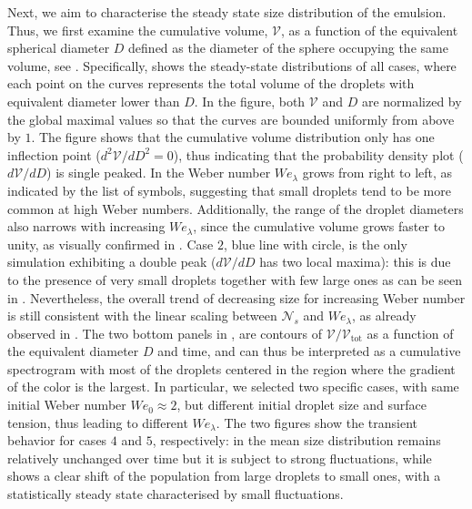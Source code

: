 Next, we aim to characterise the steady state size distribution of the emulsion. Thus, we first examine the cumulative volume, $\mathcal{V}$, as a function of the equivalent spherical diameter $D$ defined as the diameter of the sphere occupying the same volume, see . Specifically,  shows the steady-state distributions of all cases, where each point on the curves represents the total volume of the droplets with equivalent diameter lower than $D$. In the figure, both $\mathcal{V}$ and $D$ are normalized by the global maximal values so that the curves are bounded uniformly from above by $1$. The figure shows that the cumulative volume distribution only has one inflection point ($d^2 \mathcal{V}/dD^2 = 0$), thus indicating that the probability density plot ($d \mathcal{V}/dD$) is single peaked. In  the Weber number $We_\lambda$ grows from right to left, as indicated by the list of symbols, suggesting that small droplets tend to be more common at high Weber numbers. Additionally, the range of the droplet diameters also narrows with increasing $We_\lambda$, since the cumulative volume grows faster to unity, as visually confirmed in . Case $2$, blue line with circle, is the only simulation exhibiting a double peak (\ie $d \mathcal{V}/dD$ has two local maxima): this is due to the presence of very small droplets together with few large ones as can be seen in . Nevertheless, the overall trend of decreasing size for increasing Weber number is still consistent with the linear scaling between $\mathcal{N}_s$ and $We_\lambda$, as already observed in . The two bottom panels in , are contours of $\mathcal{V}/\mathcal{V}_\textrm{tot}$ as a function of the equivalent diameter $D$ and time, and can thus be interpreted as a cumulative spectrogram with most of the droplets centered in the region where the gradient of the color is the largest. In particular, we selected two specific cases, with same initial Weber number $We_0 \approx 2$, but different initial droplet size and surface tension, thus leading to different $We_\lambda$. The two figures show the transient behavior for cases $4$ and $5$, respectively: in  the mean size distribution remains relatively unchanged over time but it is subject to strong fluctuations, while  shows a clear shift of the population from large droplets to small ones, with a statistically steady state characterised by small fluctuations.


